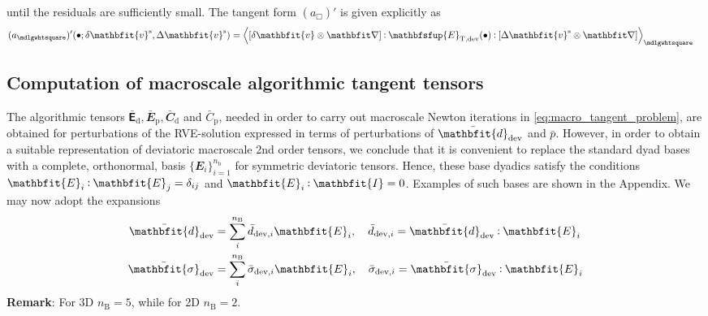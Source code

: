 \documentclass[12pt,a4paper,fleqn]{article}
\renewcommand{\ta}[1]{\mathbfit{#1}}
\renewcommand{\ts}[1]{\mathbfit{#1}}
\renewcommand{\tf}[1]{\mathbfsfup{#1}}
\renewcommand{\Box}{\mdlgwhtsquare}
\newcommand{\ded}{\mathrm{d}}
\newcommand{\dep}{\mathrm{p}}
\begin{document}
until the residuals are sufficiently small.
The tangent form $(a_\Box)'$ is given explicitly as
\begin{align}
    (a_\Box)'(\bullet; \delta \ta{v}^\fluct,\Delta{\ta{v}}^\fluct)
    & =
    \left\langle \left[\delta\ta{v}\outerp\diff\right] \dprod \tf{E}_{\majorT,\dev}(\bullet) \dprod
    \left[\Delta\ta{v}^\fluct\outerp\diff\right] \right\rangle_\Box
\end{align}


\subsection{Computation of macroscale algorithmic tangent tensors}

The algorithmic tensors $\bar{\tf{E}}_\ded, \bar{\ts E }_\dep, \bar{\ts C}_\ded$ and $\bar{C}_\dep$, needed in order to carry out macroscale Newton iterations in \eqref{eq:macro_tangent_problem}, are obtained for perturbations of the RVE-solution expressed in terms of perturbations of $\bar{\ts d}_\dev$ and $\bar{p}$. However, in order to obtain a suitable representation of deviatoric macroscale 2nd order tensors, we conclude that it is convenient to replace the standard dyad bases with a complete, orthonormal, basis $\{\ts E_i\}_{i=1}^{n_{\mathrm{b}}}$ for symmetric deviatoric tensors.
Hence, these base dyadics satisfy the conditions $\ts E_i \dprod \ts E_j = \delta_{ij}$ and $\ts E_i\dprod{\ts I}=0$.
Examples of such bases are shown in the Appendix. We may now adopt the expansions
\begin{align}
 \bar{\ts d}_\dev &= \sum_i^{n_{\mathrm{B}}} \bar{d}_{\dev,i} \ts E_i,\quad  \bar{d}_{\dev,i} = \bar{\ts d}_\dev\dprod \ts E_i
\label{eq:d_dev_base} \\
 \bar{\ts\sigma}_\dev &= \sum_i^{n_{\mathrm{B}}} \bar{\sigma}_{\dev,i} \ts E_i,\quad \bar{\sigma}_{\dev,i} = \bar{\ts\sigma}_\dev\dprod \ts E_i
\label{eq:s_dev_base}
\end{align}
\textbf{Remark}: For 3D $n_{\mathrm{B}} = 5$, while for 2D $n_{\mathrm{B}} = 2$.
\end{document}
